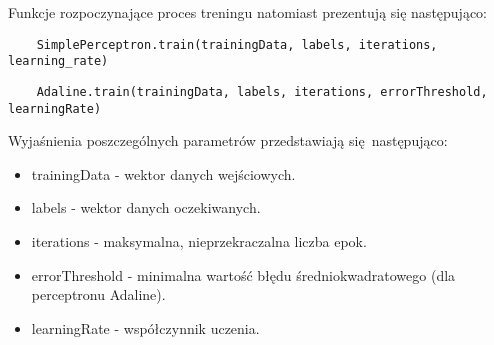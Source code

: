 \documentclass[../main.tex]{subfiles}
\begin{document}
    Funkcje rozpoczynające proces treningu natomiast prezentują się następująco:
    
    \begin{verbatim}
    SimplePerceptron.train(trainingData, labels, iterations, learning_rate)
    \end{verbatim}
    
    \begin{verbatim}
    Adaline.train(trainingData, labels, iterations, errorThreshold, learningRate)
    \end{verbatim}
    
    Wyjaśnienia poszczególnych parametrów przedstawiają się następująco:
    \begin{itemize}
     \item trainingData - wektor danych wejściowych.
     \item labels - wektor danych oczekiwanych.
     \item iterations - maksymalna, nieprzekraczalna liczba epok.
     \item errorThreshold - minimalna wartość błędu średniokwadratowego (dla perceptronu Adaline).
     \item learningRate - współczynnik uczenia.
    \end{itemize}
\end{document}
